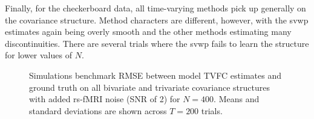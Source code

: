 Finally, for the checkerboard data, all time-varying methods pick up generally on the covariance structure.
Method characters are different, however, with the \gls{svwp} estimates again being overly smooth and the other methods estimating many discontinuities.
There are several trials where the \gls{svwp} fails to learn the structure for lower values of $N$.


\begin{figure}[ht]
  \centering
  \caption{
    Simulations benchmark RMSE between model TVFC estimates and ground truth on all bivariate and trivariate covariance structures with added rs-fMRI noise (SNR of 2) for $N = 400$.
    Means and standard deviations are shown across $T = 200$ trials.
  }
  \label{fig:sim-results-HCP-noise-all}
\end{figure}


